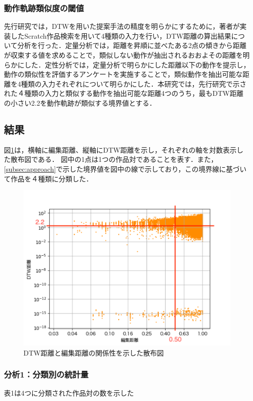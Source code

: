 \documentclass[T,J]{fose} %
\begin{document}
\subsubsection{動作軌跡類似度の閾値}
先行研究では，DTWを用いた提案手法の精度を明らかにするために，著者が実装したScratch作品検索を用いて4種類の入力を行い，DTW距離の算出結果について分析を行った．定量分析では，距離を昇順に並べたある2点の傾きから距離が収束する値を求めることで，類似しない動作が抽出されるおおよその距離を明らかにした．定性分析では，定量分析で明らかにした距離以下の動作を提示し，動作の類似性を評価するアンケートを実施することで，類似動作を抽出可能な距離を4種類の入力それぞれについて明らかにした．本研究では，先行研究で示された４種類の入力と類似する動作を抽出可能な距離4つのうち，最もDTW距離の小さい2.2を動作軌跡が類似する境界値とする．
\subsection{結果}

図\ref{fig:out-nolimit}は，横軸に編集距離、縦軸にDTW距離を示し，それぞれの軸を対数表示した散布図である．
図中の1点は1つの作品対であることを表す．また，\ref{subsec:approach}で示した境界値を図中の線で示しており，この境界線に基づいて作品を４種類に分類した．

\begin{figure}[t]
	\centering
	\includegraphics[width=1.0\linewidth]{Okamoto_fig/out-all-nolimit.pdf}
	\caption{DTW距離と編集距離の関係性を示した散布図}
	\label{fig:out-nolimit}
\end{figure}

\subsubsection{分析1：分類別の統計量}
表1は4つに分類された作品対の数を示した
\end{document}
